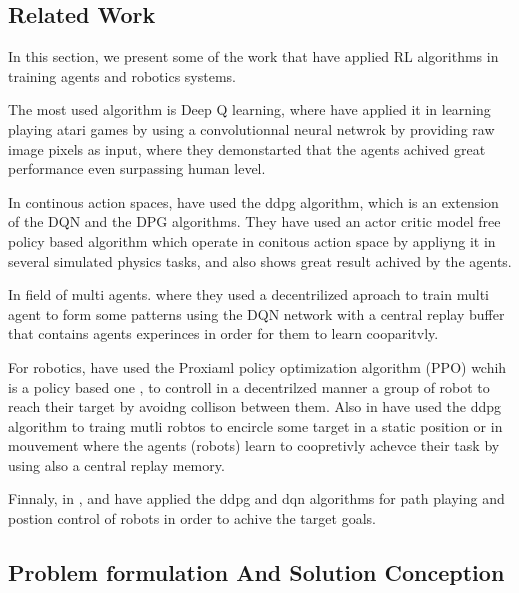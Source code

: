 \documentclass[12pt]{extarticle}
\begin{document}
\subsection{Related Work}
In this section, we present some of the work that have applied RL algorithms in  training agents and robotics systems.


The most used algorithm  is Deep Q learning, where  \cite{mnih2013playing} have applied it in learning playing atari games by using a convolutionnal neural netwrok by providing raw image pixels as input, where they demonstarted that the agents achived great performance even surpassing human level.

In continous action spaces, \cite{lillicrap2015continuous} have used the ddpg algorithm, which is an extension of the DQN and the DPG algorithms. They have used an actor critic model free  policy based algorithm which operate in conitous action space by appliyng it in several simulated physics tasks, and also shows great result achived by the agents.

In field of multi agents. \cite{diallo2020multi} where they used a decentrilized aproach to train multi agent to form some patterns using the DQN network with  a central replay buffer that contains agents experinces in order for them to learn cooparitvly.


For robotics, \cite{long2018towards} have used the Proxiaml policy optimization algorithm (PPO) wchih is a policy based one , to controll in a decentrilzed manner a group of robot to reach their target by avoidng collison between them. Also in \cite{ma2020multi} have used the ddpg algorithm to traing mutli robtos to encircle some target in a static position  or in mouvement where the agents (robots) learn to coopretivly achevce their task by using also a central replay memory.
 

Finnaly, in \cite{dong2020mobile},\cite{gong2022efficient} and \cite{quiroga2022position} have applied the ddpg and dqn algorithms for path playing and postion control of robots in order to achive the target goals.






 

  
  
  
\newpage
\pagebreak
\hspace{0pt}
\vfill
\begin{center}
\section{Problem formulation And Solution Conception}
\end{center}
\vfill
\hspace{0pt}
\end{document}
